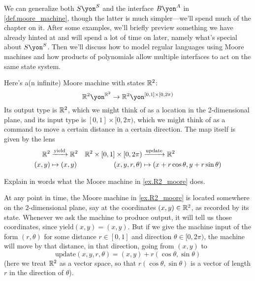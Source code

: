 \documentclass[Book-Poly]{subfiles}
\begin{document}
We can generalize both $S\yon^S$ and the interface $B\yon^A$ in \cref{def.moore_machine}, though the latter is much simpler---we'll spend much of the chapter on it. 
After some examples, we'll briefly preview something we have already hinted at and will spend a lot of time on later, namely what's special about $S\yon^S$.
Then we'll discuss how to model regular languages using Moore machines and how products of polynomials allow multiple interfaces to act on the same state system.

\begin{example}\label{ex.R2_moore}
Here's a(n infinite) Moore machine with states $\mathbb{R}^2$:
\[
\rr^2\yon^{\rr^2}\to\rr^2\yon^{[0,1]\times[0,2\pi)}%
\]
Its output type is $\mathbb{R}^2$, which we might think of as a location in the 2-dimensional plane, and its input type is $[0,1]\times[0,2\pi)$, which we might think of as a command to move a certain distance in a certain direction. The map itself is given by the lens
\begin{align*}
  \mathbb{R}^2&\xrightarrow{\text{yield}}\mathbb{R}^2&
  \mathbb{R}^2\times[0,1]\times[0,2\pi)&\xrightarrow{\text{update}}\mathbb{R}^2
  	\\
  (x,y)&\mapsto(x,y)&
  (x,y,r,\theta)&\mapsto(x+r\cos\theta, y+r\sin\theta)
\end{align*}
\end{example}

\begin{exercise}
Explain in words what the Moore machine in \cref{ex.R2_moore} does.
\begin{solution}
At any point in time, the Moore machine in \cref{ex.R2_moore} is located somewhere on the $2$-dimensional plane, say at the coordinates $(x, y) \in \mathbb{R}^2$, as recorded by its state.
Whenever we ask the machine to produce output, it will tell us those coordinates, since $\text{yield}(x, y) = (x, y)$.
But if we give the machine input of the form $(r, \theta)$ for some distance $r \in [0,1]$ and direction $\theta \in [0, 2\pi)$, the machine will move by that distance, in that direction, going from $(x, y)$ to
\[
    \text{update}(x,y,r,\theta) = (x,y) + r(\cos\theta, \sin\theta)
\]
(here we treat $\mathbb{R}^2$ as a vector space, so that $r(\cos\theta, \sin\theta)$ is a vector of length $r$ in the direction of $\theta$).
\end{solution}
\end{exercise}
\end{document}
